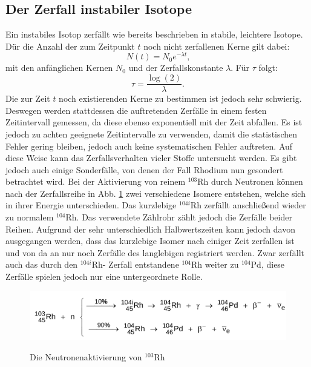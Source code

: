  \subsection{Der Zerfall instabiler Isotope}
 Ein instabiles Isotop zerfällt wie bereits beschrieben in stabile, leichtere Isotope. Dür die Anzahl der zum Zeitpunkt $t$ noch nicht zerfallenen Kerne gilt dabei:
 \begin{equation}
   N(t) = N_0 e^{-\lambda t}\text{,}
   \end{equation}
mit den anfänglichen Kernen $N_0$ und der Zerfallskonstante $\lambda$.
Für $\tau$ folgt:
\begin{equation}
  \tau = \frac{\log(2)}{\lambda}\text{.}
\end{equation}
Die zur Zeit $t$ noch existierenden Kerne zu bestimmen ist jedoch sehr schwierig.
Deswegen werden stattdessen die auftretenden Zerfälle in einem festen Zeitintervall gemessen, da diese ebenso exponentiell mit der Zeit abfallen.
Es ist jedoch zu achten geeignete Zeitintervalle zu verwenden, damit die statistischen Fehler gering bleiben, jedoch auch keine systematischen Fehler auftreten.
Auf diese Weise kann das Zerfallsverhalten vieler Stoffe untersucht werden.
Es gibt jedoch auch einige Sonderfälle, von denen der Fall Rhodium nun gesondert betrachtet wird.
Bei der Aktivierung von reinem $^{103}$Rh durch Neutronen können nach der Zerfallsreihe in Abb. \ref{fig:rod}
zwei verschiedene Isomere entstehen, welche sich in ihrer Energie unterschieden. Das kurzlebige $^{104i}$Rh zerfällt anschließend wieder zu normalem $^{104}$Rh.
Das verwendete Zählrohr zählt jedoch die Zerfälle beider Reihen. Aufgrund der sehr unterschiedlich Halbwertszeiten kann jedoch davon ausgegangen werden, dass das kurzlebige Isomer nach einiger Zeit zerfallen ist und von da an nur noch Zerfälle des langlebigen registriert werden. Zwar zerfällt auch das durch den $^{104i}$Rh- Zerfall entstandene $^{104}$Rh weiter zu $^{104}$Pd, diese Zerfälle spielen jedoch nur eine untergeordnete Rolle.
\begin{figure}
 \centering
 \caption{Die Neutronenaktivierung von $^{103}$Rh \cite{V702}}
 \includegraphics[width=\linewidth-150pt,height=\textheight-150pt,keepaspectratio]{content/rhodium.png}
 \label{fig:rod}
\end{figure}
